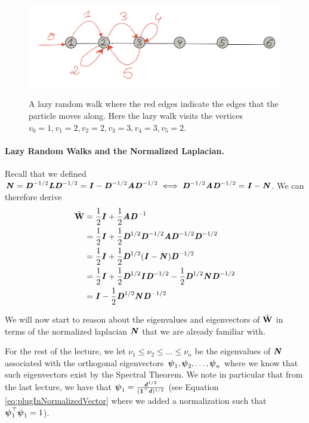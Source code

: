 \begin{figure}[!ht]
    \centering\label{fig:randomLazyWalkSimple}
    \includegraphics[scale=0.2]{fig/lec_RandomWalks_fig2.jpg}
    \caption{A lazy random walk where the red edges indicate the edges that the particle moves along. Here the lazy walk visits the vertices $v_0 = 1, v_1 = 2, v_2 = 2, v_3 = 3, v_4 = 3, v_5 = 2$.}
    \label{fig:my_label}
\end{figure}

\paragraph{Lazy Random Walks and the Normalized Laplacian.} Recall that we defined $\NN = \DD^{-1/2}\LL \DD^{-1/2} = \II - \DD^{-1/2}\AA \DD^{-1/2} \iff \DD^{-1/2}\AA \DD^{-1/2} = \II - \NN$. We can therefore derive
\begin{align*}
    \WWtil &= \frac{1}{2}\II + \frac{1}{2} \AA \DD^{-1}\\
    &= \frac{1}{2}\II + \frac{1}{2} \DD^{1/2}\DD^{-1/2} \AA \DD^{-1/2}\DD^{-1/2}\\
     &= \frac{1}{2}\II + \frac{1}{2} \DD^{1/2}(\II - \NN) \DD^{-1/2}\\
    &= \frac{1}{2}\II + \frac{1}{2} \DD^{1/2}\II \DD^{-1/2} - \frac{1}{2} \DD^{1/2}\NN \DD^{-1/2}\\
    &= \II - \frac{1}{2} \DD^{1/2}\NN \DD^{-1/2}
\end{align*}

We will now start to reason about the eigenvalues and eigenvectors of $\WWtil$ in terms of the normalized laplacian $\NN$ that we are already familiar with.

For the rest of the lecture, we let $\nu_1 \leq \nu_2 \leq \dots \leq \nu_n$ be the eigenvalues of $\NN$ associated with the orthogonal eigenvectors $\ppsi_1, \ppsi_2, \dots, \ppsi_n$ where we know that such eigenvectors exist by the Spectral Theorem. We note in particular that from the last lecture, we have that $\ppsi_1 = \frac{\dd^{1/2}}{(\vecone^{\trp} \dd)^{1/2}}$ (see Equation \ref{eq:plugInNormalizedVector} where we added a normalization such that $\ppsi_1^{\trp} \ppsi_1 = 1$).

